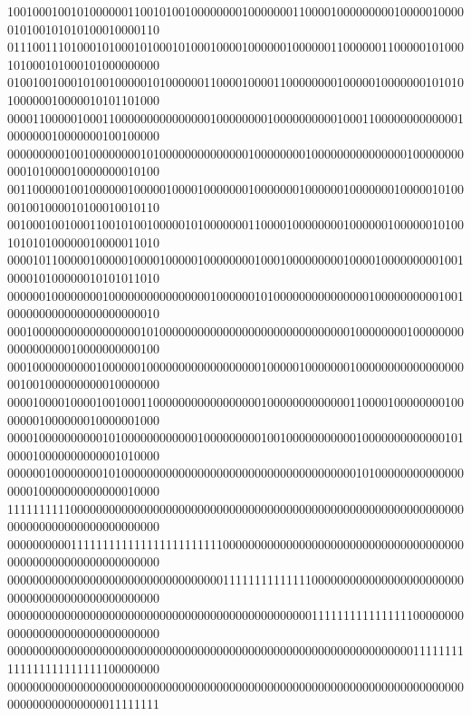 \begin{tabbing}
100100010010100000011001010010000000010000000110000100000000010000010000010100101010100010000110\\[0pt]
011100111010001010001010001010001000010000001000000110000001100000101000101000101000101000000000\\[0pt]
010010010001010010000010100000011000010000110000000010000010000000101010100000010000010101101000\\[0pt]
000011000001000110000000000000001000000001000000000010001100000000000001000000010000000100100000\\[0pt]
000000000100100000000101000000000000001000000001000000000000000100000000000101000010000000010100\\[0pt]
001100000100100000010000010000100000001000000010000001000000010000010100001001000010100010010110\\[0pt]
001000100100011001010010000010100000001100001000000001000000100000010100101010100000010000011010\\[0pt]
000010110000010000010000100000100000000100010000000001000010000000001001000010100000010101011010\\[0pt]
000000100000000100000000000000001000000101000000000000000100000000001001000000000000000000000010\\[0pt]
000100000000000000000101000000000000000000000000000000100000000100000000000000000010000000000100\\[0pt]
000100000000001000000100000000000000000010000010000000100000000000000000001001000000000010000000\\[0pt]
000010000100001001000110000000000000000010000000000000110000100000000100000001000000010000001000\\[0pt]
000010000000000101000000000000100000000010010000000000010000000000000101000010000000000001010000\\[0pt]
000000100000000101000000000000000000000000000000000000010100000000000000000010000000000000010000\\[0pt]
111111111100000000000000000000000000000000000000000000000000000000000000000000000000000000000000\\[0pt]
000000000011111111111111111111111100000000000000000000000000000000000000000000000000000000000000\\[0pt]
000000000000000000000000000000000011111111111111000000000000000000000000000000000000000000000000\\[0pt]
000000000000000000000000000000000000000000000000111111111111111100000000000000000000000000000000\\[0pt]
000000000000000000000000000000000000000000000000000000000000000011111111111111111111111100000000\\[0pt]
000000000000000000000000000000000000000000000000000000000000000000000000000000000000000011111111\\[0pt]
\end{tabbing}

